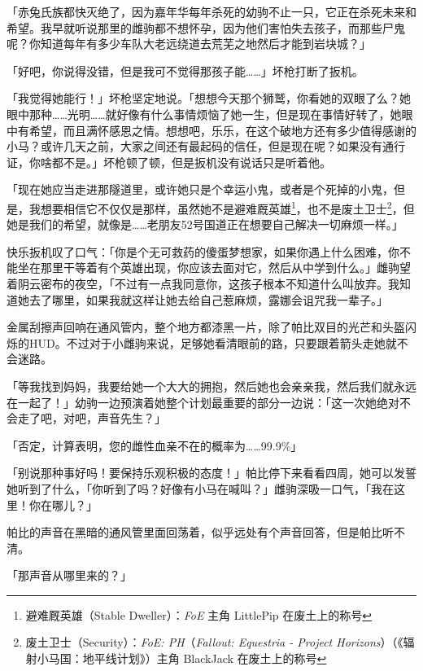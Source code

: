 「赤兔氏族都快灭绝了，因为嘉年华每年杀死的幼驹不止一只，它正在杀死未来和希望。我早就听说那里的雌驹都不想怀孕，因为他们害怕失去孩子，而那些尸鬼呢？你知道每年有多少车队大老远绕道去荒芜之地然后才能到岩块城？」

「好吧，你说得没错，但是我可不觉得那孩子能……」坏枪打断了扳机。

「我觉得她能行！」坏枪坚定地说。「想想今天那个狮鹫，你看她的双眼了么？她眼中那种……光明……就好像有什么事情烦恼了她一生，但是现在事情好转了，她眼中有希望，而且满怀感恩之情。想想吧，乐乐，在这个破地方还有多少值得感谢的小马？或许几天之前，大家之间还有最起码的信任，但是现在呢？如果没有通行证，你啥都不是。」坏枪顿了顿，但是扳机没有说话只是听着他。

「现在她应当走进那隧道里，或许她只是个幸运小鬼，或者是个死掉的小鬼，但是，我想要相信它不仅仅是那样，虽然她不是避难厩英雄\footnote{避难厩英雄（Stable Dweller）：\emph{FoE} 主角 LittlePip 在废土上的称号}，也不是废土卫士\footnote{废土卫士（Security）：\emph{FoE: PH}（\emph{Fallout: Equestria - Project Horizons}）（《辐射小马国：地平线计划》）主角 BlackJack 在废土上的称号}，但她是我们的希望，就像是……老朋友52号国道正在想要自己解决一切麻烦一样。」

快乐扳机叹了口气：「你是个无可救药的傻蛋梦想家，如果你遇上什么困难，你不能坐在那里干等着有个英雄出现，你应该去面对它，然后从中学到什么。」雌驹望着阴云密布的夜空，「不过有一点我同意你，这孩子根本不知道什么叫放弃。我知道她去了哪里，如果我就这样让她去给自己惹麻烦，露娜会诅咒我一辈子。」

\horizonline


金属刮擦声回响在通风管内，整个地方都漆黑一片，除了帕比双目的光芒和头盔闪烁的HUD。不过对于小雌驹来说，足够她看清眼前的路，只要跟着箭头走她就不会迷路。

「等我找到妈妈，我要给她一个大大的拥抱，然后她也会亲亲我，然后我们就永远在一起了！」幼驹一边预演着她整个计划最重要的部分一边说：「这一次她绝对不会走了吧，对吧，声音先生？」

「{\mtzh 否定，计算表明，您的雌性血亲不在的概率为……99.9\%}」

「别说那种事好吗！要保持乐观积极的态度！」帕比停下来看看四周，她可以发誓她听到了什么，「你听到了吗？好像有小马在喊叫？」雌驹深吸一口气，「我在这里！你在哪儿？」

帕比的声音在黑暗的通风管里面回荡着，似乎远处有个声音回答，但是帕比听不清。

「那声音从哪里来的？」

